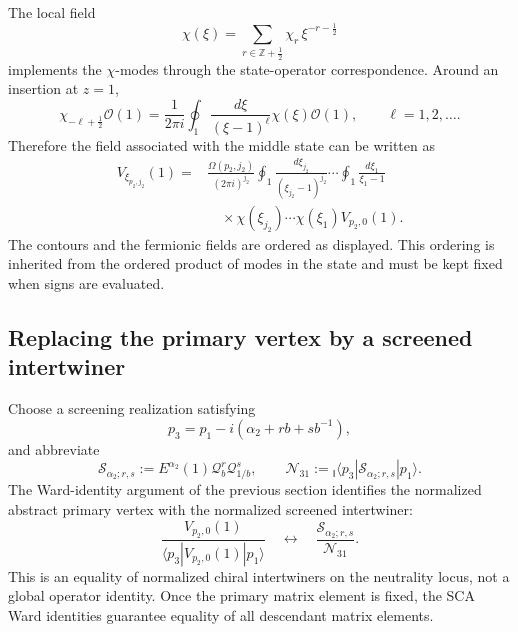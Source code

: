 \documentclass[11pt]{article}
\newcommand{\Ibra}[1]{{}_{\mathsf I}\!\langle #1|}
\begin{document}
The local field
\begin{equation}
 \chi(\xi)
 =
 \sum_{r\in\mathbb Z+\frac12}
 \chi_r\,\xi^{-r-\frac12}
 \label{eq:chi-local-field}
\end{equation}
implements the \(\chi\)-modes through the state-operator correspondence.
Around an insertion at \(z=1\),
\begin{equation}
 \chi_{-\ell+\frac12}\mathcal O(1)
 =
 \frac{1}{2\pi i}
 \oint_{1}
 \frac{d\xi}{(\xi-1)^\ell}
 \chi(\xi)\mathcal O(1),
 \qquad
 \ell=1,2,\ldots.
 \label{eq:chi-mode-contour-extraction}
\end{equation}
Therefore the field associated with the middle state can be written as
\begin{align}
 V_{\xi_{p_2,j_2}}(1)
 ={}&
 \frac{\Omega(p_2,j_2)}{(2\pi i)^{j_2}}
 \oint_{1}\frac{d\xi_{j_2}}{(\xi_{j_2}-1)^{j_2}}
 \cdots
 \oint_{1}\frac{d\xi_1}{\xi_1-1}
 \nonumber\\
 &\quad\times
 \chi(\xi_{j_2})\cdots\chi(\xi_1)
 V_{p_2,0}(1).
 \label{eq:middle-chi-state-operator-map}
\end{align}
The contours and the fermionic fields are ordered as displayed.  This
ordering is inherited from the ordered product of modes in the state and
must be kept fixed when signs are evaluated.

\subsection{Replacing the primary vertex by a screened intertwiner}

Choose a screening realization satisfying
\begin{equation}
 p_3
 =
 p_1-i\left(\alpha_2+rb+sb^{-1}\right),
 \label{eq:3.13-neutrality-condition}
\end{equation}
and abbreviate
\begin{equation}
 \mathcal S_{\alpha_2;r,s}
 :=
 E^{\alpha_2}(1)\mathcal Q_b^r\mathcal Q_{1/b}^s,
 \qquad
 \mathcal N_{31}
 :=
 \Ibra{p_3}
 \mathcal S_{\alpha_2;r,s}
 |p_1\rangle.
 \label{eq:screened-intertwiner-and-normalization}
\end{equation}
The Ward-identity argument of the previous section identifies the
normalized abstract primary vertex with the normalized screened
intertwiner:
\begin{equation}
 \frac{
  V_{p_2,0}(1)
 }{
  \langle p_3|V_{p_2,0}(1)|p_1\rangle
 }
 \quad\longleftrightarrow\quad
 \frac{
  \mathcal S_{\alpha_2;r,s}
 }{
  \mathcal N_{31}
 }.
 \label{eq:normalized-primary-to-screened-intertwiner}
\end{equation}
This is an equality of normalized chiral intertwiners on the neutrality
locus, not a global operator identity.  Once the primary matrix element is
fixed, the SCA Ward identities guarantee equality of all descendant matrix
elements.
\end{document}
